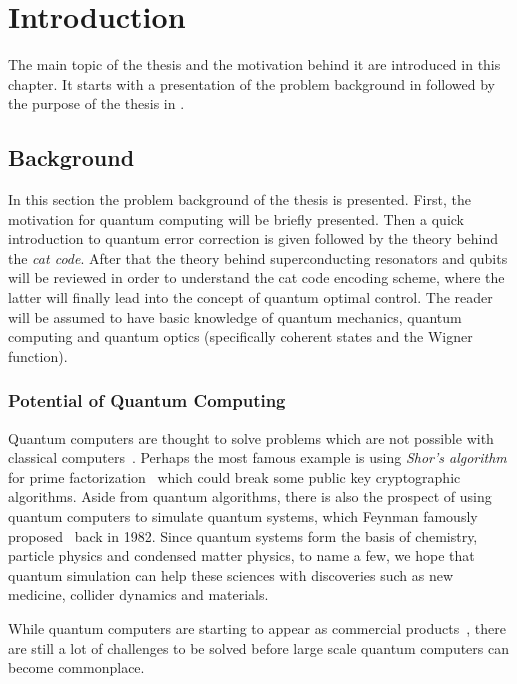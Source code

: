 \documentclass[main.tex]{subfiles}
\begin{document}
\chapter{Introduction}
The main topic of the thesis and the motivation behind it are introduced in this chapter.
It starts with a presentation of the problem background in  followed by the purpose of the thesis in .

\section{Background}%
\label{sec:background}
In this section the problem background of the thesis is presented.
First, the motivation for quantum computing will be briefly presented.
Then a quick introduction to quantum error correction is given followed by the theory behind the \emph{cat code}.
After that the theory behind superconducting resonators and qubits will be reviewed in order to understand the cat code encoding scheme, where the latter will finally lead into the concept of quantum optimal control.
The reader will be assumed to have basic knowledge of quantum mechanics, quantum computing and quantum optics (specifically coherent states and the Wigner function).

\subsection{Potential of Quantum Computing}
Quantum computers are thought to solve problems which are not possible with classical computers~\cite{preskill_quantum_2018}.
Perhaps the most famous example is using \emph{Shor's algorithm} for prime factorization~\cite{shor_polynomial-time_1997} which could break some public key cryptographic algorithms.
Aside from quantum algorithms, there is also the prospect of using quantum computers to simulate quantum systems, which Feynman famously proposed~\cite{feynman_simulating_1982} back in 1982.
Since quantum systems form the basis of chemistry, particle physics and condensed matter physics, to name a few, we hope that quantum simulation can help these sciences with discoveries such as new medicine, collider dynamics and materials.  

While quantum computers are starting to appear as commercial products~\cite{santos_ibm_2016}, there are still a lot of challenges to be solved before large scale quantum computers can become commonplace.
\end{document}
